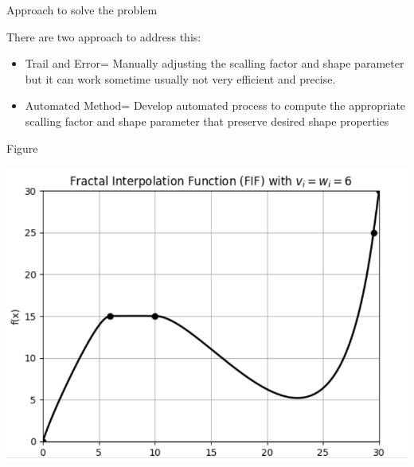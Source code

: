 \documentclass{beamer}
\begin{document}
\begin{frame}{Approach to solve the problem}

\item There are two approach to address this:
\begin{itemize}
    \item Trail and Error= Manually adjusting the scalling factor and shape parameter but it can work sometime usually not very efficient and precise.
    \item Automated Method= Develop automated process to compute the appropriate scalling factor and shape parameter that preserve desired shape properties 
\end{itemize}

    


    
\end{frame}
\begin{frame}{Figure}

    \includegraphics[width=1\textwidth]{ppt_fig.png}
\end{frame}
\end{document}
